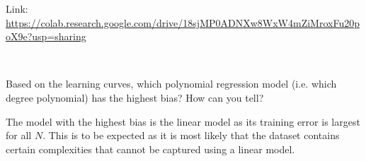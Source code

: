 \begin{solution}
  Link: \url{https://colab.research.google.com/drive/18sjMP0ADNXw8WxW4mZiMroxFu20poX9e?usp=sharing}
  \begin{figure}[H]
    \\
  \end{figure}
  \end{solution}

\begin{problem}[3]
  Based on the learning curves, which polynomial regression model (i.e. which degree polynomial) has the highest bias? How can you tell?
\end{problem}
\begin{solution}
 The model with the highest bias is the linear model as its training error is largest for all $N$. This is to be expected as it is most likely that the dataset contains certain complexities that cannot be captured using a linear model.
\end{solution}

